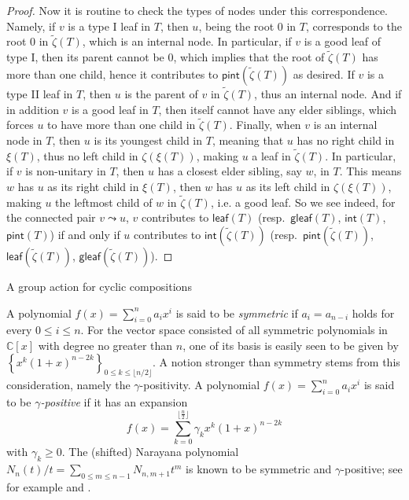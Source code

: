 \documentclass[reqno]{amsart}
\makeatletter
\numberwithin{equation}{section}
\theoremstyle{definition}
\theoremstyle{named}
\newcommand{\set}[1]{\left\{#1\right\}}
\def\section{\@startsection{section}{1}
  \z@{.7\linespacing\@plus\linespacing}{.5\linespacing}

  {\normalfont\scshape}}
\newcommand{\bC}{\mathbb{C}}
\newcommand{\curly}{\mathrel{\leadsto}}
\def\leaf{\mathsf{leaf}}
\def\gleaf{\mathsf{gleaf}}
\def\int{\mathsf{int}}
\def\pint{\mathsf{pint}}
\makeatother
\begin{document}
\begin{proof}
Now it is routine to check the types of nodes under this correspondence. Namely, if $v$ is a type I leaf in $T$, then $u$, being the root $0$ in $T$, corresponds to the root $0$ in $\widetilde{\zeta}(T)$, which is an internal node. In particular, if $v$ is a good leaf of type I, then its parent cannot be $0$, which implies that the root of $\widetilde{\zeta}(T)$ has more than one child, hence it contributes to $\pint(\widetilde{\zeta}(T))$ as desired. If $v$ is a type II leaf in $T$, then $u$ is the parent of $v$ in $\widetilde{\zeta}(T)$, thus an internal node. And if in addition $v$ is a good leaf in $T$, then itself cannot have any elder siblings, which forces $u$ to have more than one child in $\widetilde{\zeta}(T)$. Finally, when $v$ is an internal node in $T$, then $u$ is its youngest child in $T$, meaning that $u$ has no right child in $\xi(T)$, thus no left child in $\zeta(\xi(T))$, making $u$ a leaf in $\widetilde{\zeta}(T)$. In particular, if $v$ is non-unitary in $T$, then $u$ has a closest elder sibling, say $w$, in $T$. This means $w$ has $u$ as its right child in $\xi(T)$, then $w$ has $u$ as its left child in $\zeta(\xi(T))$, making $u$ the leftmost child of $w$ in $\widetilde{\zeta}(T)$, i.e. a good leaf. So we see indeed, for the connected pair $v\curly u$, $v$ contributes to $\leaf(T)$ (resp.~$\gleaf(T)$, $\int(T)$, $\pint(T)$) if and only if $u$ contributes to $\int(\widetilde{\zeta}(T))$ (resp.~$\pint(\widetilde{\zeta}(T))$, $\leaf(\widetilde{\zeta}(T))$, $\gleaf(\widetilde{\zeta}(T))$).



\end{proof}



\section{A group action for cyclic compositions}\label{sec:gamma}

A polynomial $f(x)=\sum_{i=0}^n a_i x^i$ is said to be {\it symmetric} if $a_i=a_{n-i}$ holds for every $0\le i\le n$. For the vector space consisted of all symmetric polynomials in $\bC[x]$ with degree no greater than $n$, one of its basis is easily seen to be given by $\set{x^k(1+x)^{n-2k}}_{0\le k\le \lfloor n/2 \rfloor}$. A notion stronger than symmetry stems from this consideration, namely the $\gamma$-positivity. A polynomial $f(x)=\sum_{i=0}^n a_i x^i$ is said to be {\it $\gamma$-positive} if it has an expansion
$$f(x)=\sum_{k=0}^{\lfloor\frac{n}{2}\rfloor}\gamma_kx^k(1+x)^{n-2k}$$ 
with $\gamma_k\ge 0$. The (shifted) Narayana polynomial $N_n(t)/t=\sum_{0\le m\le n-1}N_{n,m+1}t^m$ is known to be symmetric and $\gamma$-positive; see for example \cite[sect.~4.3]{Pet2015} and \cite{Ath2018}. 
\end{document}
